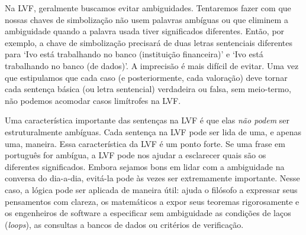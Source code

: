 Na LVF, geralmente buscamos evitar ambiguidades. Tentaremos fazer com que nossas chaves de simbolização não usem palavras ambíguas ou que eliminem a ambiguidade quando a palavra usada tiver significados diferentes. Então, por exemplo, a chave de simbolização precisará de duas letras sentenciais diferentes para `Ivo está trabalhando no banco (instituição financeira)' e `Ivo está trabalhando no banco (de dados)'. A imprecisão é mais difícil de evitar. Uma vez que estipulamos que cada caso (e posteriormente, cada valoração) deve tornar cada sentença básica (ou letra sentencial) verdadeira ou falsa, sem meio-termo, não podemos acomodar casos limítrofes na LVF. 

Uma característica importante das sentenças na LVF é que elas \emph{não podem} ser estruturalmente ambíguas. Cada sentença na LVF pode ser lida de uma, e apenas uma, maneira. Essa característica da LVF é um ponto forte. Se uma frase em português for ambígua, a LVF pode nos ajudar a esclarecer quais são os diferentes significados. Embora sejamos bons em lidar com a ambiguidade na conversa do dia-a-dia, evitá-la pode às vezes ser extremamente importante. Nesse caso, a lógica pode ser aplicada de maneira útil: ajuda o filósofo a expressar seus pensamentos com clareza, os matemáticos a expor seus teoremas rigorosamente e os engenheiros de software a especificar sem ambiguidade as condições de laços (\textit{loops}), as consultas a bancos de dados ou critérios de verificação. 

